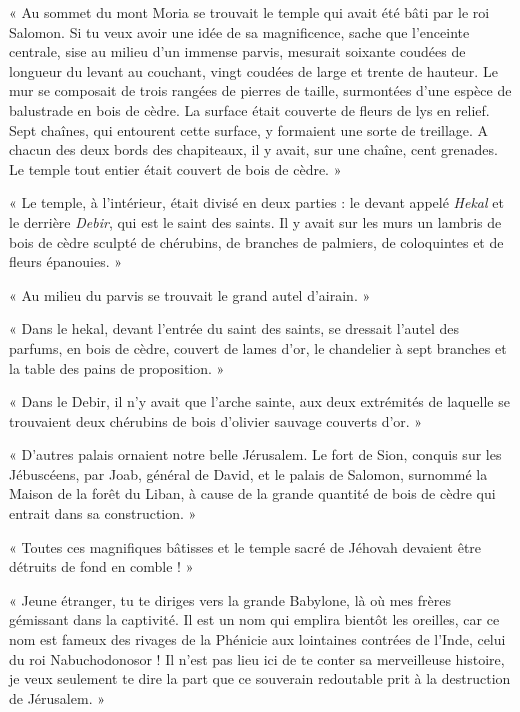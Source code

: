 \documentclass[a4paper, 11pt, oneside, polutonikogreek, french]{article}
\begin{document}
« Au sommet du mont Moria se trouvait le temple qui avait été bâti par le roi Salomon. Si tu veux avoir une idée de sa magnificence, sache que l'enceinte centrale, sise au milieu d'un immense parvis, mesurait soixante coudées de longueur du levant au couchant, vingt coudées de large et trente de hauteur. Le mur se composait de trois rangées de pierres de taille, surmontées d'une espèce de balustrade en bois de cèdre. La surface était couverte de fleurs de lys en relief. Sept chaînes, qui entourent cette surface, y formaient une sorte de treillage. A chacun des deux bords des chapiteaux, il y avait, sur une chaîne, cent grenades. Le temple tout entier était couvert de bois de cèdre. »

« Le temple, à l'intérieur, était divisé en deux parties : le devant appelé \emph{Hekal} et le derrière \emph{Debir}, qui est le saint des saints. Il y avait sur les murs un lambris de bois de cèdre sculpté de chérubins, de branches de palmiers, de coloquintes et de fleurs épanouies. »

« Au milieu du parvis se trouvait le grand autel d'airain. »

« Dans le hekal, devant l'entrée du saint des saints, se dressait l'autel des parfums, en bois de cèdre, couvert de lames d'or, le chandelier à sept branches et la table des pains de proposition. »

« Dans le Debir, il n'y avait que l'arche sainte, aux deux extrémités de laquelle se trouvaient deux chérubins de bois d'olivier sauvage couverts d'or. »

« D'autres palais ornaient notre belle Jérusalem. Le fort de Sion, conquis sur les Jébuscéens, par Joab, général de David, et le palais de Salomon, surnommé la Maison de la forêt du Liban, à cause de la grande quantité de bois de cèdre qui entrait dans sa construction. »

« Toutes ces magnifiques bâtisses et le temple sacré de Jéhovah devaient être détruits de fond en comble ! »

\bigskip
\centerline{\EightStarTaper}
\centerline{\EightStarTaper\EightStarTaper}
\bigskip

« Jeune étranger, tu te diriges vers la grande Babylone, là où mes frères gémissant dans la captivité. Il est un nom qui emplira bientôt les oreilles, car ce nom est fameux des rivages de la Phénicie aux lointaines contrées de l'Inde, celui du roi Nabuchodonosor ! Il n'est pas lieu ici de te conter sa merveilleuse histoire, je veux seulement te dire la part que ce souverain redoutable prit à la destruction de Jérusalem. »
\end{document}
